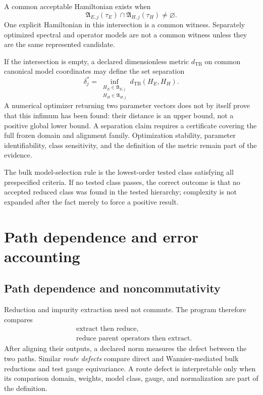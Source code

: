 A common acceptable Hamiltonian exists when
\begin{equation}
  \mathfrak A_{E,j}(\tau_E)
  \cap
  \mathfrak A_{H,j}(\tau_H)
  \neq\varnothing.
\end{equation}
One explicit Hamiltonian in this intersection is a common witness. Separately
optimized spectral and operator models are not a common witness unless they are
the same represented candidate.

If the intersection is empty, a declared dimensionless metric
$d_{\mathrm{TB}}$ on common canonical model coordinates may define the set
separation
\begin{equation}
  \delta_j^{\ast}
  =
  \inf_{\substack{
    H_E\in\mathfrak A_{E,j}\\
    H_H\in\mathfrak A_{H,j}}}
  d_{\mathrm{TB}}(H_E,H_H).
\end{equation}
A numerical optimizer returning two parameter vectors does not by itself prove
that this infimum has been found: their distance is an upper bound, not a
positive global lower bound. A separation claim requires a certificate covering
the full frozen domain and alignment family. Optimization stability, parameter
identifiability, class sensitivity, and the definition of the metric remain
part of the evidence.

The bulk model-selection rule is the lowest-order tested class satisfying all
prespecified criteria. If no tested class passes, the correct outcome is that
no accepted reduced class was found in the tested hierarchy; complexity is not
expanded after the fact merely to force a positive result.

\section{Path dependence and error accounting}

\subsection{Path dependence and noncommutativity}


Reduction and impurity extraction need not commute. The program therefore
compares
\begin{align}
  &\text{extract then reduce},\\
  &\text{reduce parent operators then extract}.
\end{align}
After aligning their outputs, a declared norm measures the defect between the
two paths. Similar \emph{route defects} compare direct and Wannier-mediated bulk
reductions and test gauge equivariance. A route defect is interpretable only
when its comparison domain, weights, model class, gauge, and normalization are
part of the definition.

